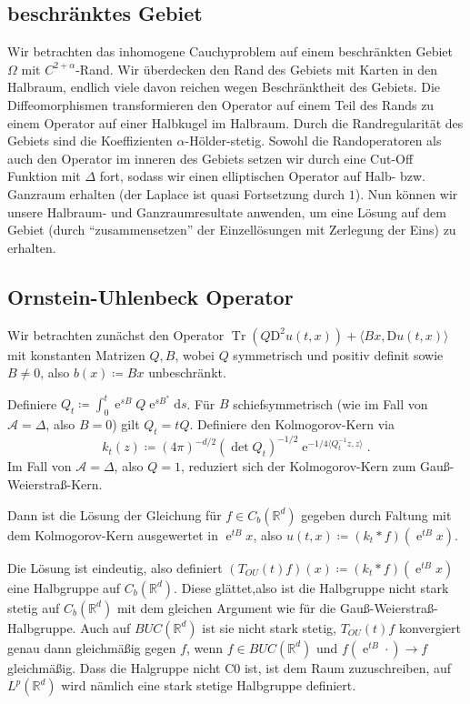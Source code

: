 \documentclass[11pt,a4paper]{scrartcl}
\newcommand{\R}{\mathbb{R}} %
\newcommand{\A}{\mathcal{A}}
\theoremstyle{plain}
\theoremstyle{definition}
\theoremstyle{remark}
\DeclareMathOperator{\Tr}{Tr}
\DeclareMathOperator{\e}{e}
\begin{document}
\subsection{beschränktes Gebiet}

Wir betrachten das inhomogene Cauchyproblem auf einem beschränkten Gebiet $\Omega$ mit $C^{2+\alpha}$-Rand. Wir überdecken den Rand des Gebiets mit Karten in den Halbraum, endlich viele davon reichen wegen Beschränktheit des Gebiets. Die Diffeomorphismen transformieren den Operator auf einem Teil des Rands zu einem Operator auf einer Halbkugel im Halbraum. Durch die Randregularität des Gebiets sind die Koeffizienten $\alpha$-Hölder-stetig. Sowohl die Randoperatoren als auch den Operator im inneren des Gebiets setzen wir durch eine Cut-Off Funktion mit $\Delta$ fort, sodass wir einen elliptischen Operator auf Halb- bzw. Ganzraum erhalten (der Laplace ist quasi Fortsetzung durch $1$). Nun können wir unsere Halbraum- und Ganzraumresultate anwenden, um eine Lösung auf dem Gebiet (durch \enquote{zusammensetzen} der Einzellösungen mit Zerlegung der Eins) zu erhalten.

\subsection{Ornstein-Uhlenbeck Operator}

Wir betrachten zunächst den Operator $\Tr(Q\mathrm{D}^2 u(t,x))+\langle Bx, \mathrm{D}u(t,x)\rangle$ mit konstanten Matrizen $Q,B$, wobei $Q$ symmetrisch und positiv definit sowie $B\neq 0$, also $b(x)\coloneqq Bx$ unbeschränkt.

Definiere $Q_t\coloneqq \int_0^t \e^{sB}Q\e^{sB^*}\mathrm{d}s$. Für $B$ schiefsymmetrisch (wie im Fall von $\A=\Delta$, also $B=0$) gilt $Q_t=tQ$. Definiere den Kolmogorov-Kern via $$k_t(z)\coloneqq (4\pi)^{-d/2}(\det Q_t)^{-1/2} \e^{-1/4\langle Q_t^{-1}z, z\rangle}.$$ Im Fall von $\A=\Delta$, also $Q=1$, reduziert sich der Kolmogorov-Kern zum Gauß-Weierstraß-Kern.

Dann ist die Lösung der Gleichung für $f\in C_b(\R^d)$ gegeben durch Faltung mit dem Kolmogorov-Kern ausgewertet in $\e^{tB}x$, also $u(t,x)\coloneqq (k_t\ast f)(\e^{tB}x)$.

Die Lösung ist eindeutig, also definiert $(T_{OU}(t)f)(x)\coloneqq (k_t\ast f)(\e^{tB}x)$ eine Halbgruppe auf $C_b(\R^d)$. Diese glättet,also ist die Halbgruppe nicht stark stetig auf $C_b(\R^d)$ mit dem gleichen Argument wie für die Gauß-Weierstraß-Halbgruppe. Auch auf $BUC(\R^d)$ ist sie nicht stark stetig, $T_{OU}(t)f$ konvergiert genau dann gleichmäßig gegen $f$, wenn $f\in BUC(\R^d)$ und $f(\e^{tB}\cdot)\to f$ gleichmäßig. Dass die Halgruppe nicht C0 ist, ist dem Raum zuzuschreiben, auf $L^p(\R^d)$ wird nämlich eine stark stetige Halbgruppe definiert.
\end{document}

